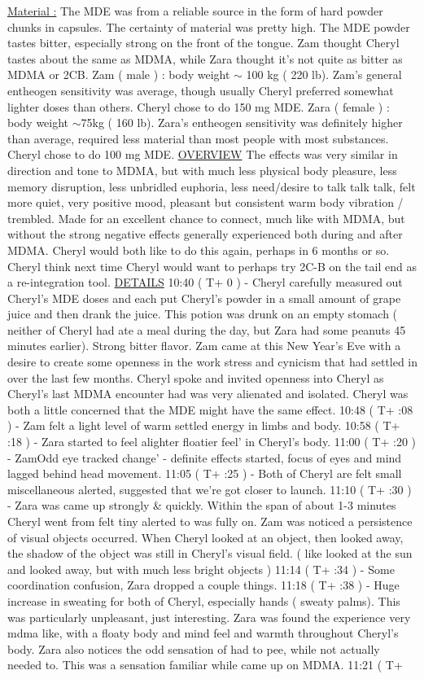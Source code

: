 \documentclass[12pt]{book}
\begin{document}
\underline{Material :} The MDE was from a reliable source in the form of hard powder chunks in capsules. The certainty of material was pretty high. The MDE powder tastes bitter, especially strong on the front of the tongue. Zam thought Cheryl tastes about the same as MDMA, while Zara thought it's not quite as bitter as MDMA or 2CB. Zam ( male ) : body weight $\sim$ 100 kg ( 220 lb). Zam's general entheogen sensitivity was average, though usually Cheryl preferred somewhat lighter doses than others. Cheryl chose to do 150 mg MDE. Zara ( female ) : body weight $\sim$75kg ( 160 lb). Zara's entheogen sensitivity was definitely higher than average, required less material than most people with most substances. Cheryl chose to do 100 mg MDE. \underline{OVERVIEW} The effects was very similar in direction and tone to MDMA, but with much less physical body pleasure, less memory disruption, less unbridled euphoria, less need/desire to talk talk talk, felt more quiet, very positive mood, pleasant but consistent warm body vibration / trembled. Made for an excellent chance to connect, much like with MDMA, but without the strong negative effects generally experienced both during and after MDMA. Cheryl would both like to do this again, perhaps in 6 months or so. Cheryl think next time Cheryl would want to perhaps try 2C-B on the tail end as a re-integration tool. \underline{DETAILS} 10:40 ( T+ 0 ) - Cheryl carefully measured out Cheryl's MDE doses and each put Cheryl's powder in a small amount of grape juice and then drank the juice. This potion was drunk on an empty stomach ( neither of Cheryl had ate a meal during the day, but Zara had some peanuts 45 minutes earlier). Strong bitter flavor. Zam came at this New Year's Eve with a desire to create some openness in the work stress and cynicism that had settled in over the last few months. Cheryl spoke and invited openness into Cheryl as Cheryl's last MDMA encounter had was very alienated and isolated. Cheryl was both a little concerned that the MDE might have the same effect. 10:48 ( T+ :08 ) - Zam felt a light level of warm settled energy in limbs and body. 10:58 ( T+ :18 ) - Zara started to feel alighter floatier feel' in Cheryl's body. 11:00 ( T+ :20 ) - ZamOdd eye tracked change' - definite effects started, focus of eyes and mind lagged behind head movement. 11:05 ( T+ :25 ) - Both of Cheryl are felt small miscellaneous alerted, suggested that we're got closer to launch. 11:10 ( T+ :30 ) - Zara was came up strongly \& quickly. Within the span of about 1-3 minutes Cheryl went from felt tiny alerted to was fully on. Zam was noticed a persistence of visual objects occurred. When Cheryl looked at an object, then looked away, the shadow of the object was still in Cheryl's visual field. ( like looked at the sun and looked away, but with much less bright objects ) 11:14 ( T+ :34 ) - Some coordination confusion, Zara dropped a couple things. 11:18 ( T+ :38 ) - Huge increase in sweating for both of Cheryl, especially hands ( sweaty palms). This was particularly unpleasant, just interesting. Zara was found the experience very mdma like, with a floaty body and mind feel and warmth throughout Cheryl's body. Zara also notices the odd sensation of had to pee, while not actually needed to. This was a sensation familiar while came up on MDMA. 11:21 ( T+ 
\end{document}

